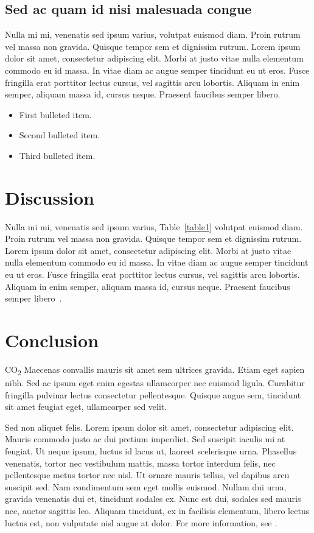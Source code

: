 \documentclass[10pt,letterpaper]{article}
\newcommand{\1}{^{(1)}}
\newcommand{\2}{^{(2)}}
\begin{document}
\subsection*{Sed ac quam id nisi malesuada congue}

Nulla mi mi, venenatis sed ipsum varius, volutpat euismod diam. Proin rutrum vel massa non gravida. Quisque tempor sem et dignissim rutrum. Lorem ipsum dolor sit amet, consectetur adipiscing elit. Morbi at justo vitae nulla elementum commodo eu id massa. In vitae diam ac augue semper tincidunt eu ut eros. Fusce fringilla erat porttitor lectus cursus, vel sagittis arcu lobortis. Aliquam in enim semper, aliquam massa id, cursus neque. Praesent faucibus semper libero.

\begin{itemize}
	\item First bulleted item.
	\item Second bulleted item.
	\item Third bulleted item.
\end{itemize}

\section*{Discussion}
Nulla mi mi, venenatis sed ipsum varius, Table~\ref{table1} volutpat euismod diam. Proin rutrum vel massa non gravida. Quisque tempor sem et dignissim rutrum. Lorem ipsum dolor sit amet, consectetur adipiscing elit. Morbi at justo vitae nulla elementum commodo eu id massa. In vitae diam ac augue semper tincidunt eu ut eros. Fusce fringilla erat porttitor lectus cursus, vel sagittis arcu lobortis. Aliquam in enim semper, aliquam massa id, cursus neque. Praesent faucibus semper libero~\cite{bib3}.

\section*{Conclusion}

CO\textsubscript{2} Maecenas convallis mauris sit amet sem ultrices gravida. Etiam eget sapien nibh. Sed ac ipsum eget enim egestas ullamcorper nec euismod ligula. Curabitur fringilla pulvinar lectus consectetur pellentesque. Quisque augue sem, tincidunt sit amet feugiat eget, ullamcorper sed velit. 

Sed non aliquet felis. Lorem ipsum dolor sit amet, consectetur adipiscing elit. Mauris commodo justo ac dui pretium imperdiet. Sed suscipit iaculis mi at feugiat. Ut neque ipsum, luctus id lacus ut, laoreet scelerisque urna. Phasellus venenatis, tortor nec vestibulum mattis, massa tortor interdum felis, nec pellentesque metus tortor nec nisl. Ut ornare mauris tellus, vel dapibus arcu suscipit sed. Nam condimentum sem eget mollis euismod. Nullam dui urna, gravida venenatis dui et, tincidunt sodales ex. Nunc est dui, sodales sed mauris nec, auctor sagittis leo. Aliquam tincidunt, ex in facilisis elementum, libero lectus luctus est, non vulputate nisl augue at dolor. For more information, see .
\end{document}
